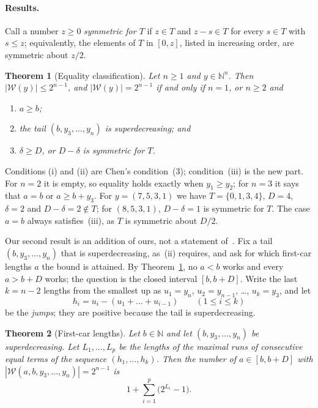 \documentclass[11pt]{article}
\newtheorem{theorem}{Theorem}
\theoremstyle{remark}
\newcommand{\N}{\mathbb N}
\newcommand{\W}{\mathcal W}
\begin{document}
\paragraph{Results.} Call a number $z\ge0$ \emph{symmetric for $T$} if $z\in T$
and $z-s\in T$ for every $s\in T$ with $s\le z$; equivalently, the elements of
$T$ in $[0,z]$, listed in increasing order, are symmetric about $z/2$.

\begin{theorem}[Equality classification]\label{thm:class}
Let $n\ge1$ and $y\in\N^n$. Then $|\W(y)|\le2^{n-1}$, and $|\W(y)|=2^{n-1}$ if
and only if $n=1$, or $n\ge2$ and
\begin{enumerate}
\item[(i)] $a\ge b$;
\item[(ii)] the tail $(b,y_3,\dots,y_n)$ is superdecreasing; and
\item[(iii)] $\delta\ge D$, or $D-\delta$ is symmetric for $T$.
\end{enumerate}
\end{theorem}

Conditions (i) and (ii) are Chen's condition~(3); condition~(iii) is the new
part. For $n=2$ it is empty, so equality holds exactly when $y_1\ge y_2$; for
$n=3$ it says that $a=b$ or $a\ge b+y_3$. For $y=(7,5,3,1)$ we have
$T=\{0,1,3,4\}$, $D=4$, $\delta=2$ and $D-\delta=2\notin T$; for $(8,5,3,1)$,
$D-\delta=1$ is symmetric for $T$. The case $a=b$ always satisfies~(iii), as
$T$ is symmetric about $D/2$.

Our second result is an addition of ours, not a statement of~\cite{chen}. Fix
a tail $(b,y_3,\dots,y_n)$ that is superdecreasing, as~(ii) requires, and ask
for which first-car lengths $a$ the bound is attained. By
Theorem~\ref{thm:class}, no $a<b$ works and every $a>b+D$ works; the question is
the closed interval $[b,b+D]$. Write the last $k=n-2$ lengths from the smallest
up as $u_1=y_n$, $u_2=y_{n-1}$, \dots, $u_k=y_3$, and let
\[
h_i=u_i-(u_1+\dots+u_{i-1})\qquad(1\le i\le k)
\]
be the \emph{jumps}; they are positive because the tail is superdecreasing.

\begin{theorem}[First-car lengths]\label{thm:count}
Let $b\in\N$ and let $(b,y_3,\dots,y_n)$ be superdecreasing. Let
$L_1,\dots,L_p$ be the lengths of the maximal runs of consecutive equal terms
of the sequence $(h_1,\dots,h_k)$. Then the number of $a\in[b,b+D]$ with
$|\W(a,b,y_3,\dots,y_n)|=2^{n-1}$ is
\[
1+\sum_{i=1}^p\bigl(2^{L_i}-1\bigr).
\]
\end{theorem}
\end{document}
